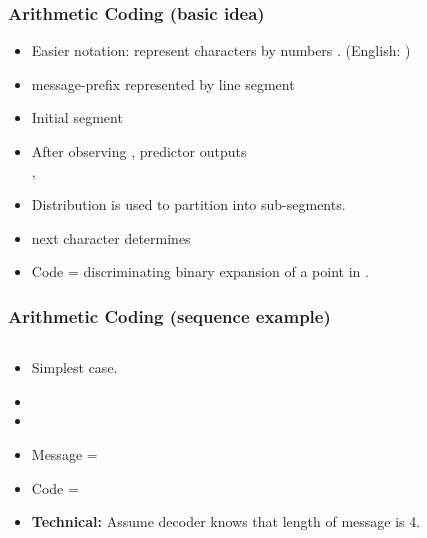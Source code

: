 \documentclass{beamer}
\begin{document}
\begin{frame}
\frametitle{Arithmetic Coding (basic idea)}
\begin{itemize}
\item Easier notation: represent characters by numbers . (English: )
\item message-prefix  represented by line segment \R{$[l_{t-1},u_{t-1})$}
\item Initial segment \R{$[l_0,u_0) = [0,1)$}
\item After observing , predictor outputs \\
,
\item Distribution is used to partition \R{$[l_{t-1},u_{t-1})$} into \R{$| \Sigma |$} sub-segments.
\item next character  determines \R{$[l_t,u_t)$}
\item Code = discriminating binary expansion of a point in \R{$[l_t,u_t)$}.
\end{itemize}
\end{frame}

\begin{frame}
\frametitle{Arithmetic Coding (sequence example)}
\begin{columns}

\begin{column}[T]{4cm}
\begin{itemize}
\item Simplest case.
\item {}
\item {}
\item Message = 
\item Code = 
\item {\bf Technical:} Assume decoder knows that length of message is 4.
\end{itemize}
\end{column}

\begin{column}[T]{5.5cm}
\end{column}

\end{columns}
\end{frame}
\end{document}
